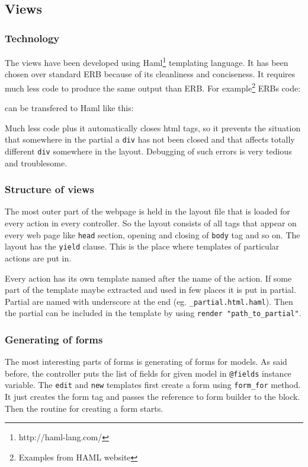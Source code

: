     \subsection{Views}
      \subsubsection{Technology}
        The views have been developed using Haml\footnote{http://haml-lang.com/} templating language. It has been chosen 
        over standard ERB because of its cleanliness and conciseness. It requires much less code to produce the same output
        than ERB. For example\footnote{Examples from HAML website} ERBs code:
        
        
        
        can be transfered to Haml like this:
        
        
        
        Much less code plus it automatically closes html tags, so it prevents the situation that somewhere in the partial
        a \texttt{div} has not been closed and that affects totally different \texttt{div} somewhere in the layout.
        Debugging of such errors is very tedious and troublesome.
        
      \subsubsection{Structure of views}
        The most outer part of the webpage is held in the layout file that is loaded for every action in every controller.
        So the layout consists of all tags that appear on every web page like \texttt{head} section, opening and closing
        of \texttt{body} tag and so on. The layout has the \texttt{yield} clause. This is the place where templates
        of particular actions are put in.
        
        Every action has its own template named after the name of the action. If some part of the template maybe extracted and used in 
        few places it is put in partial. Partial are named with underscore at the end (eg. \texttt{\_partial.html.haml}). Then
        the partial can be included in the template by using \texttt{render "path\_to\_partial"}.
        
    \subsubsection{Generating of forms}
      The most interesting parts of forms is generating of forms for models. As said before, the controller puts 
      the list of fields for given model in \texttt{@fields} instance variable. The \texttt{edit} and \texttt{new}
      templates first create a form using \texttt{form\_for} method. It just creates the form tag and passes
      the reference to form builder to the block. Then the routine for creating a form starts. 
      
